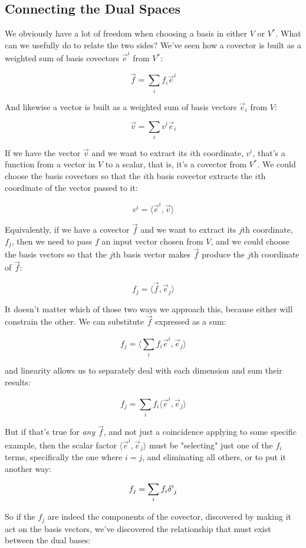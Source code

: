 \subsection{Connecting the Dual Spaces}

We obviously have a lot of freedom when choosing a basis in either $V$ or $V^*$. What can we usefully do to relate the two sides? We've seen how a covector is built as a weighted sum of basis covectors $\vec{e}^i$ from $V^*$:

$$
\vec{f} = \sum_i f_i \vec{e}^i
$$

And likewise a vector is built as a weighted sum of basis vectors $\vec{e}_i$ from $V$:

$$
\vec{v} = \sum_i v^i \vec{e}_i
$$

If we have the vector $\vec{v}$ and we want to extract its $i$th coordinate, $v^i$, that's a function from a vector in $V$ to a scalar, that is, it's a covector from $V^*$. We could choose the basis covectors so that the $i$th basis covector extracts the $i$th coordinate of the vector passed to it:

$$
v^i = \langle \vec{e}^i , \vec{v} \rangle
$$ 

Equivalently, if we have a covector $\vec{f}$ and we want to extract its $j$th coordinate, $f_j$, then we need to pass $f$ an input vector chosen from $V$, and we could choose the basis vectors so that the $j$th basis vector makes $\vec{f}$ produce the $j$th coordinate of $\vec{f}$:

$$
f_j = \langle \vec{f} , \vec{e}_j\rangle
$$

It doesn't matter which of those two ways we approach this, because either will constrain the other. We can substitute $\vec{f}$ expressed as a sum:

$$
f_j = \langle \sum_i f_i \vec{e}^i , \vec{e}_j\rangle
$$

and linearity allows us to separately deal with each dimension and sum their results:

$$
f_j = \sum_i f_i \langle \vec{e}^i , \vec{e}_j\rangle
$$

But if that's true for \textit{any} $\vec{f}$, and not just a coincidence applying to some specific example, then the scalar factor $\langle \vec{e}^i , \vec{e}_j\rangle$ must be "selecting" just one of the $f_i$ terms, specifically the one where $i = j$, and eliminating all others, or to put it another way:

$$
f_j = \sum_i f_i \delta \indices{^i_j}
$$

So if the $f_j$ are indeed the components of the covector, discovered by making it act on the basis vectors, we've discovered the relationship that must exist between the dual bases:

